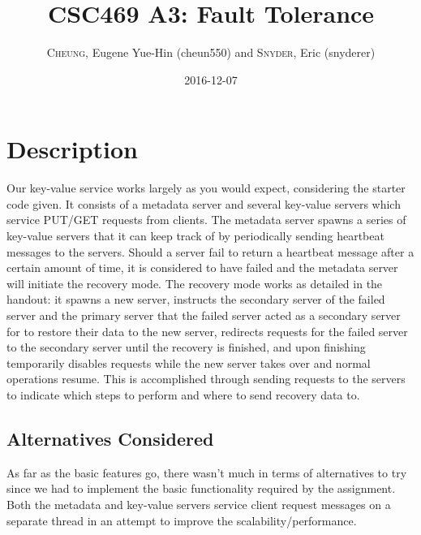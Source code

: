 \documentclass[11pt,twoside]{article}
\begin{document}
\title{CSC469 A3: Fault Tolerance}
\author{\textsc{Cheung}, Eugene Yue-Hin (cheun550) and \textsc{Snyder}, Eric (snyderer)}
\date{2016-12-07}
\maketitle

\section{Description}
Our key-value service works largely as you would expect, considering the starter code given. It consists of a metadata server and several key-value servers which service PUT/GET requests from clients. The metadata server spawns a series of key-value servers that it can keep track of by periodically sending heartbeat messages to the servers. Should a server fail to return a heartbeat message after a certain amount of time, it is considered to have failed and the metadata server will initiate the recovery mode. The recovery mode works as detailed in the handout: it spawns a new server, instructs the secondary server of the failed server and the primary server that the failed server acted as a secondary server for to restore their data to the new server, redirects requests for the failed server to the secondary server until the recovery is finished, and upon finishing temporarily disables requests while the new server takes over and normal operations resume. This is accomplished through sending requests to the servers to indicate which steps to perform and where to send recovery data to.

\subsection{Alternatives Considered}
As far as the basic features go, there wasn't much in terms of alternatives to try since we had to implement the basic functionality required by the assignment. Both the metadata and key-value servers service client request messages on a separate thread in an attempt to improve the scalability/performance.
\end{document}

